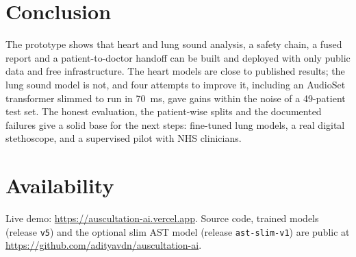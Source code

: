 \documentclass[conference]{IEEEtran}
\begin{document}
\section{Conclusion}
The prototype shows that heart and lung sound analysis, a safety chain, a fused report and a patient-to-doctor handoff can be built and deployed with only public data and free infrastructure. The heart models are close to published results; the lung sound model is not, and four attempts to improve it, including an AudioSet transformer slimmed to run in 70~ms, gave gains within the noise of a 49-patient test set. The honest evaluation, the patient-wise splits and the documented failures give a solid base for the next steps: fine-tuned lung models, a real digital stethoscope, and a supervised pilot with NHS clinicians.

\section*{Availability}
Live demo: \url{https://auscultation-ai.vercel.app}. Source code, trained models (release \texttt{v5}) and the optional slim AST model (release \texttt{ast-slim-v1}) are public at \url{https://github.com/adityavdn/auscultation-ai}.
\end{document}
